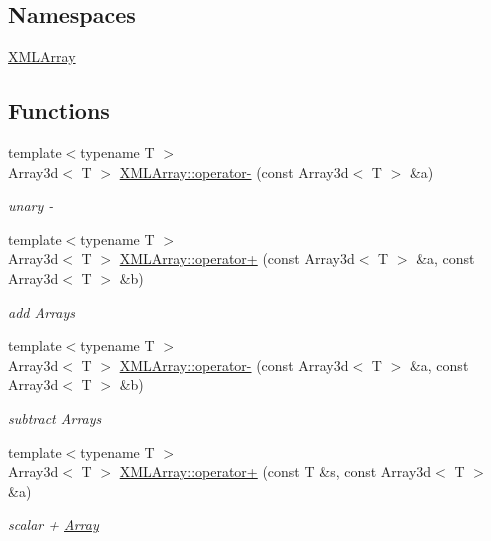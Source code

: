 \subsection*{Namespaces}
\begin{DoxyCompactItemize}
\item 
 \mbox{\hyperlink{namespaceXMLArray}{X\+M\+L\+Array}}
\end{DoxyCompactItemize}
\subsection*{Functions}
\begin{DoxyCompactItemize}
\item 
{\footnotesize template$<$typename T $>$ }\\Array3d$<$ T $>$ \mbox{\hyperlink{namespaceXMLArray_abf0b390db9be6de84a10b451c1dfc18f}{X\+M\+L\+Array\+::operator-\/}} (const Array3d$<$ T $>$ \&a)
\begin{DoxyCompactList}\small\item\em unary -\/ \end{DoxyCompactList}\item 
{\footnotesize template$<$typename T $>$ }\\Array3d$<$ T $>$ \mbox{\hyperlink{namespaceXMLArray_a63ffde7a3ab533938f603805d5b517e8}{X\+M\+L\+Array\+::operator+}} (const Array3d$<$ T $>$ \&a, const Array3d$<$ T $>$ \&b)
\begin{DoxyCompactList}\small\item\em add Arrays \end{DoxyCompactList}\item 
{\footnotesize template$<$typename T $>$ }\\Array3d$<$ T $>$ \mbox{\hyperlink{namespaceXMLArray_a84aa6790ab54770ccc98e82864af7d7b}{X\+M\+L\+Array\+::operator-\/}} (const Array3d$<$ T $>$ \&a, const Array3d$<$ T $>$ \&b)
\begin{DoxyCompactList}\small\item\em subtract Arrays \end{DoxyCompactList}\item 
{\footnotesize template$<$typename T $>$ }\\Array3d$<$ T $>$ \mbox{\hyperlink{namespaceXMLArray_a38e9584aa25b1b93bbdeda1cc0d680c6}{X\+M\+L\+Array\+::operator+}} (const T \&s, const Array3d$<$ T $>$ \&a)
\begin{DoxyCompactList}\small\item\em scalar + \mbox{\hyperlink{classXMLArray_1_1Array}{Array}} \end{DoxyCompactList}\item 

\end{DoxyCompactItemize}
